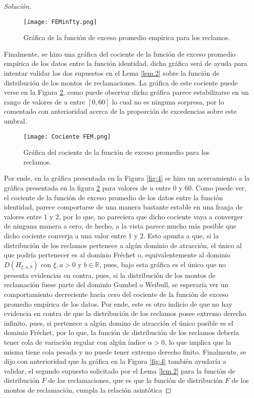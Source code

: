 \documentclass[10.5pt,notitlepage]{article}
\newenvironment{solucion}
  {\begin{proof}[Solución]}
  {\end{proof}}
\newcommand{\RR}{\mathbb{R}}
\theoremstyle{plain}
\begin{document}
\begin{solucion}
\begin{figure}[htb]
    \centering
    \texttt{[image: FEMinfty.png]}
    \caption{Gráfica de la función de exceso promedio empírica para los reclamos.}
    \label{fig:2}
\end{figure}
Finalmente, se hizo una gráfica del cociente de la función de exceso promedio empírica de los datos entre la función identidad, dicha gráfica será de ayuda para intentar validar los dos supuestos en el Lema \ref{lem.2} sobre la función de distribución de los montos de reclamaciones. La gráfica de este cociente puede verse en la Figura \ref{fig:3}, como puede observar dicha gráfica parece estabilizarse en un rango de valores de \(u\) entre \([0,60]\) lo cual no es ninguna sorpresa, por lo comentado con anterioridad acerca de la proporción de excedencias sobre este umbral.
\begin{figure}[htb]
    \centering
    \texttt{[image: Cociente FEM.png]}
    \caption{Gráfica del cociente de la función de exceso promedio para los reclamos.}
    \label{fig:3}
\end{figure}
Por ende, en la gráfica presentada en la Figura \ref{fig:4} se hizo un acercamiento a la gráfica presentada en la figura \ref{fig:3} para valores de \(u\) entre \(0\) y \(60\). Como puede ver, el cociente de la función de exceso promedio de los datos entre la función identidad, parece comportarse de una manera bastante estable en una franja de valores entre \(1\) y \(2\), por lo que, no pareciera que dicho cociente vaya a converger de ninguna manera a cero, de hecho, a la vista parece mucho más posible que dicho cociente converja a una valor entre \(1\) y \(2\). Esto apunta a que, si la distribución de los reclamos pertenece a algún dominio de atracción, el único al que podría pertenecer es al dominio Fréchet o, equivalentemente al dominio \(D(H_{\xi,a,b})\) con \(\xi,a >0\) y \(b \in \RR\), pues, bajo esta gráfica es el único que no presenta evidencias en contra, pues, si la distribución de los montos de reclamación fuese parte del dominio Gumbel o Weibull, se esperaría ver un comportamiento decreciente hacia cero del cociente de la función de exceso promedio empírica de los datos. Por ende, este es otro indicio de que no hay evidencia en contra de que la distribución de los reclamos posee extremo derecho infinito, pues, si pertenece a algún domino de atracción el único posible es el dominio Fréchet, por lo que, la función de distribución de los reclamos debería tener cola de variación regular con algún índice \(\alpha >0\), lo que implica que la misma tiene cola pesada y no puede tener extremo derecho finito. Finalmente, se dijo con anterioridad que la gráfica en la Figura \ref{fig:4} también ayudaría a validar, el segundo supuesto solicitado por el Lema \ref{lem.2} para la función de distribución \(F\) de las reclamaciones, que es que la función de distribución \(F\) de los montos de reclamación, cumpla la relación asintótica

\end{solucion}
\end{document}
